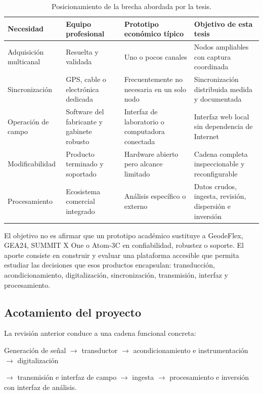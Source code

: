 \begin{table}[ht]
\centering
\small
\caption{Posicionamiento de la brecha abordada por la tesis.}
\begin{tabularx}{\textwidth}{@{}>{\raggedright\arraybackslash}p{} Y Y Y@{}}
\toprule
\textbf{Necesidad} & \textbf{Equipo profesional} & \textbf{Prototipo económico típico} & \textbf{Objetivo de esta tesis} \\
\midrule
Adquisición multicanal & Resuelta y validada & Uno o pocos canales & Nodos ampliables con captura coordinada \\
Sincronización & GPS, cable o electrónica dedicada & Frecuentemente no necesaria en un solo nodo & Sincronización distribuida medida y documentada \\
Operación de campo & Software del fabricante y gabinete robusto & Interfaz de laboratorio o computadora conectada & Interfaz web local sin dependencia de Internet \\
Modificabilidad & Producto terminado y soportado & Hardware abierto pero alcance limitado & Cadena completa inspeccionable y reconfigurable \\
Procesamiento & Ecosistema comercial integrado & Análisis específico o externo & Datos crudos, ingesta, revisión, dispersión e inversión \\
\bottomrule
\end{tabularx}
\end{table}

El objetivo no es afirmar que un prototipo académico sustituye a GeodeFlex, GEA24,
SUMMIT X One o Atom-3C en confiabilidad, robustez o soporte. El aporte consiste en
construir y evaluar una plataforma accesible que permita estudiar las decisiones que
esos productos encapsulan: transducción, acondicionamiento, digitalización,
sincronización, transmisión, interfaz y procesamiento.

\subsection{Acotamiento del proyecto}

La revisión anterior conduce a una cadena funcional concreta:

\begin{center}
\small
Generación de señal $\longrightarrow$ transductor $\longrightarrow$
acondicionamiento e instrumentación $\longrightarrow$ digitalización

$\longrightarrow$ transmisión e interfaz de campo $\longrightarrow$ ingesta
$\longrightarrow$ procesamiento e inversión con interfaz de análisis.
\end{center}

